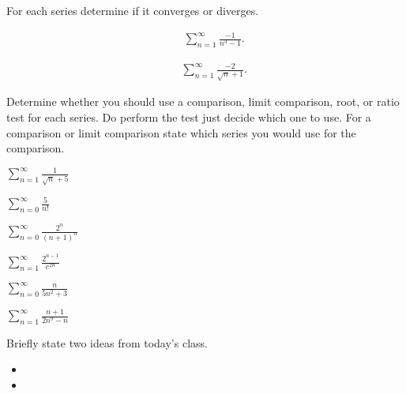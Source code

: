 
\begin{problem}
\item For each series determine if it converges or diverges. 
  \begin{subproblem}
  \item 
    \begin{eqnarray*}
      & & \sum^\infty_{n=1} \frac{-1}{n^3-1}.
    \end{eqnarray*}
    \vfill
  \item 
    \begin{eqnarray*}
      & & \sum^\infty_{n=1} \frac{-2}{\sqrt{n}+1}.
    \end{eqnarray*}
    \vfill
  \end{subproblem}
\end{problem}


\begin{problem}
\item Determine whether you should use a comparison, limit comparison,
  root, or ratio test for each series. Do perform the test just decide
  which one to use. For a comparison or limit comparison state which
  series you would use for the comparison.
  \begin{subproblem}
    \item $\sum_{n=1}^\infty \frac{1}{\sqrt{n}+5}$
      \vfill
    \item $\sum_{n=0}^\infty \frac{5}{n!}$
      \vfill
    \item $\sum_{n=0}^\infty \frac{2^n}{(n+1)^n} $
      \vfill
    \item $\sum_{n=1}^\infty \frac{2^{n-1}}{e^{2n}}$
      \vfill
    \item $\sum_{n=0}^\infty \frac{n}{5n^2+3} $
      \vfill
    \item $\sum_{n=1}^\infty \frac{n+1}{2n^9-n}$
      \vfill
  \end{subproblem}
\end{problem}


\postClass

\begin{problem}
\item Briefly state two ideas from today's class.
  \begin{itemize}
  \item 
  \item 
  \end{itemize}
\item 
  \begin{subproblem}
    \item
  \end{subproblem}
\end{problem}


